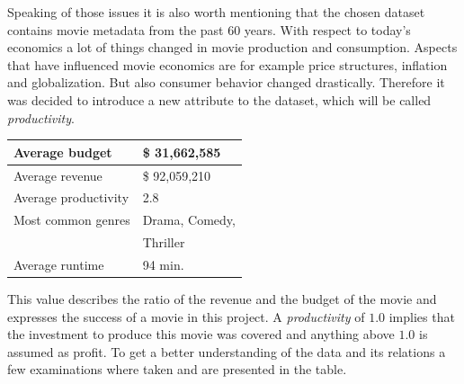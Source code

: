 Speaking of those issues it is also worth mentioning that the chosen dataset contains movie metadata from the past 60 years. With respect to today's economics a lot of things changed in movie production and consumption. Aspects that have influenced movie economics are for example price structures, inflation and globalization. But also consumer behavior changed drastically. Therefore it was decided to introduce a new attribute to the dataset, which will be called \textit{productivity}. 
\begin{table}
	\begin{tabular}{| l | l |}
	\hline
	Average budget & \$ 31,662,585 \\ \hline
	Average revenue & \$ 92,059,210 \\ \hline
	Average productivity & 2.8 \\ \hline
	Most common genres & Drama, Comedy,\\ & Thriller \\ \hline
	Average runtime & 94 min. \\ \hline
	\end{tabular}
\end{table} 
This value describes the ratio of the revenue and the budget of the movie and expresses the success of a movie in this project. A \textit{productivity} of $1.0$ implies that the investment to produce this movie was covered and anything above $1.0$ is assumed as profit.
To get a better understanding of the data and its relations a few examinations where taken and are presented in the table.
